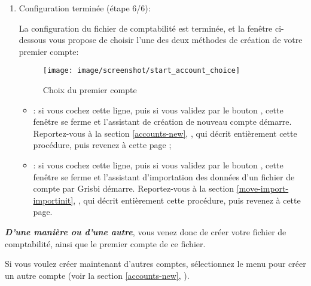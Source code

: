 \begin{enumerate}
	\item Configuration terminée (étape 6/6):\par
	La configuration du fichier de comptabilité est terminée, et la fenêtre ci-dessous vous propose de choisir l'une des deux méthodes de création de votre premier
compte:%
\vspace{5mm}
\begin{figure}[htbp]
\begin{center}
\texttt{[image: image/screenshot/start\_account\_choice]}
\end{center}
\caption{Choix du premier compte}
\label{start_account_choice}
\end{figure}

		\begin{itemize}
			\item {} : si vous cochez cette ligne, puis si vous validez par le bouton , cette fenêtre se ferme et l'assistant de création de nouveau compte démarre. Reportez-vous à la section \vref{accounts-new}, , qui décrit entièrement cette procédure, puis revenez à cette page ;

			\item {} : si vous cochez cette ligne, puis si vous validez par le bouton , cette fenêtre se ferme et l'assistant d'importation des données d'un fichier de compte par Grisbi démarre. Reportez-vous à la section \vref{move-import-importinit}, , qui décrit entièrement cette procédure, puis revenez à cette page.
		\end{itemize}
\end{enumerate}

\label{start-newfile-end}

\textit{\textbf{D'une manière ou d'une autre}}, vous venez donc de créer votre fichier de comptabilité, ainsi que le premier compte de ce fichier. 

Si vous voulez créer maintenant d'autres comptes, sélectionnez le menu  pour créer un autre compte (voir la section \vref{accounts-new}, ).

